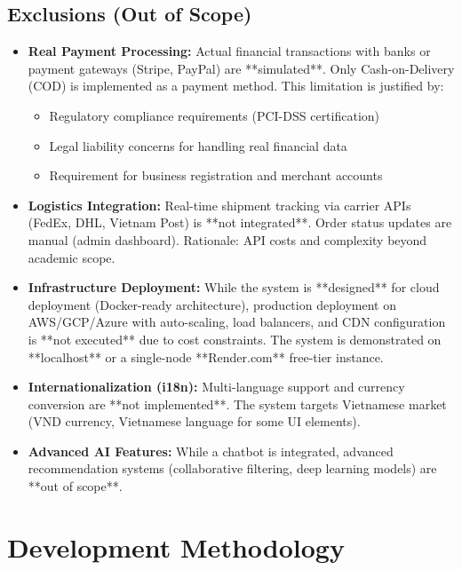 \documentclass[12pt, a4paper]{report}
\begin{document}
\subsection{Exclusions (Out of Scope)}

\begin{itemize}
    \item \textbf{Real Payment Processing:} Actual financial transactions with banks or payment gateways (Stripe, PayPal) are **simulated**. Only Cash-on-Delivery (COD) is implemented as a payment method. This limitation is justified by:
    \begin{itemize}
        \item Regulatory compliance requirements (PCI-DSS certification)
        \item Legal liability concerns for handling real financial data
        \item Requirement for business registration and merchant accounts
    \end{itemize}
    
    \item \textbf{Logistics Integration:} Real-time shipment tracking via carrier APIs (FedEx, DHL, Vietnam Post) is **not integrated**. Order status updates are manual (admin dashboard). Rationale: API costs and complexity beyond academic scope.
    
    \item \textbf{Infrastructure Deployment:} While the system is **designed** for cloud deployment (Docker-ready architecture), production deployment on AWS/GCP/Azure with auto-scaling, load balancers, and CDN configuration is **not executed** due to cost constraints. The system is demonstrated on **localhost** or a single-node **Render.com** free-tier instance.
    
    \item \textbf{Internationalization (i18n):} Multi-language support and currency conversion are **not implemented**. The system targets Vietnamese market (VND currency, Vietnamese language for some UI elements).
    
    \item \textbf{Advanced AI Features:} While a chatbot is integrated, advanced recommendation systems (collaborative filtering, deep learning models) are **out of scope**.
\end{itemize}

\section{Development Methodology}
\end{document}
